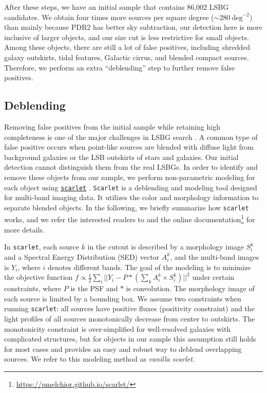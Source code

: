 \documentclass[twocolumn,astrosymb,twocolappendix]{aastex631}
\newcommand{\code}[1]{\texttt{#1}}
\begin{document}
\begin{CJK*}{UTF8}{gbsn}
\vspace{2em}
After these steps, we have an initial sample that contains 86,002 LSBG candidates. We obtain four times more sources per square degree ($\sim 280\ \mathrm{deg}^{-2}$) than  mainly because PDR2 has better sky subtraction, our detection here is more inclusive of larger objects, and our size cut is less restrictive for small objects. Among these objects, there are still a lot of false positives, including shredded galaxy outskirts, tidal features, Galactic cirrus, and blended compact sources. Therefore, we perform an extra ``deblending'' step to further remove false positives.  

\subsection{Deblending}\label{sec:deblending}
Removing false positives from the initial sample while retaining high completeness is one of the major challenges in LSBG search \citep[e.g.,][]{vanDokkum2015,Koda2015,Yagi2016,Greco2018,SAGA-I,Zaritsky2019,Zaritsky2021,Tanoglidis2021,Zaritsky2022}. A common type of false positive occurs when point-like sources are blended with diffuse light from background galaxies or the LSB outskirts of stars and galaxies. Our initial detection cannot distinguish them from the real LSBGs. In order to identify and remove these objects from our sample, we perform non-parametric modeling for each object using \href{https://pmelchior.github.io/scarlet/}{\code{scarlet}} \citep{Melchior2018}. \code{Scarlet} is a deblending and modeling tool designed for multi-band imaging data. It utilizes the color and morphology information to separate blended objects. In the following, we briefly summarize how \code{scarlet} works, and we refer the interested readers to \citet{Melchior2018,Melchior2021} and the online documentation\footnote{\url{https://pmelchior.github.io/scarlet/}} for more details. 

In \code{scarlet}, each source $k$ in the cutout is described by a morphology image $S^k_i$ and a Spectral Energy Distribution (SED) vector $A^k_i$, and the multi-band images is $Y_i$, where $i$ denotes different bands. The goal of the modeling is to minimize the objective function $f \propto \frac{1}{2}\sum_i ||Y_i - P \ast (\sum_k A^k_i\times S^k_i)||^{2}$ under certain constraints, where $P$ is the PSF and $*$ is convolution. The morphology image of each source is limited by a bounding box. We assume two constraints when running \code{scarlet}: all sources have positive fluxes (positivity constraint) and the light profiles of all sources monotonically decrease from center to outskirts. The monotonicity constraint is over-simplified for well-resolved galaxies with complicated structures, but for objects in our sample this assumption still holds for most cases and provides an easy and robust way to deblend overlapping sources. We refer to this modeling method as \textit{vanilla scarlet}. 


\end{CJK*}
\end{document}
